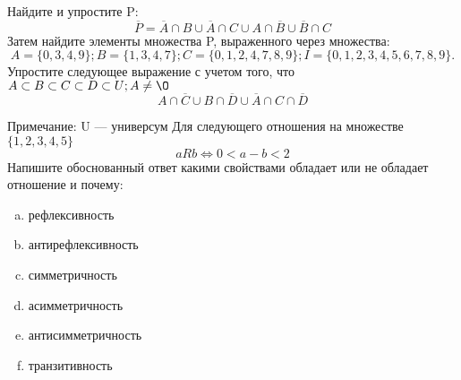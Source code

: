\documentclass[10pt]{exam}
\begin{document}
\begin{questions}
\question
Найдите и упростите P:
\begin{equation*}
\overline{P} = \overline{A} \cap B \cup \overline{A} \cap C \cup A \cap \overline{B} \cup \overline{B} \cap C
\end{equation*}
Затем найдите элементы множества P, выраженного через множества:
\begin{equation*}
A = \{0, 3, 4, 9\}; 
B = \{1, 3, 4, 7\};
C = \{0, 1, 2, 4, 7, 8, 9\};
I = \{0, 1, 2, 3, 4, 5, 6, 7, 8, 9\}.
\end{equation*}\question
Упростите следующее выражение с учетом того, что $A\subset B \subset C \subset D \subset U; A \neq \O$
\begin{equation*}
A \cap  \overline{C} \cup B \cap \overline{D} \cup  \overline{A} \cap C \cap  \overline{D}
\end{equation*}

Примечание: U — универсум\question
Для следующего отношения на множестве $\{1, 2, 3, 4, 5\}$ 
\begin{equation*}
aRb \iff 0 < a-b<2
\end{equation*}
Напишите обоснованный ответ какими свойствами обладает или не обладает отношение и почему:   
\begin{enumerate} [a)]\setcounter{enumi}{0}
\item рефлексивность
\item антирефлексивность
\item симметричность
\item асимметричность
\item антисимметричность
\item транзитивность
\end{enumerate}


\end{questions}
\end{document}
